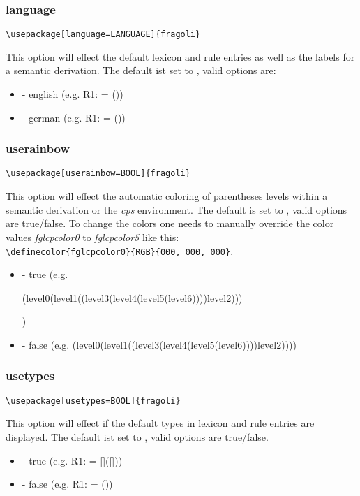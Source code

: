 \documentclass[10pt, a4paper]{article}
\newenvironment{itemizeexample}{
	\begin{itemize}
		\setlength\itemsep{-.5em}
	}
	{
	\end{itemize}
}
\begin{document}
	\subsubsection{language}
	\begin{lstlisting}[style=A]
			\usepackage[language=LANGUAGE]{fragoli}
	\end{lstlisting}
	This option will effect the default lexicon and rule entries as well as the labels for a semantic derivation. The default ist set to \texttt{}, valid options are:
	\begin{itemizeexample}
		\item[-] english (e.g. R1:  = (\lambheN{}))
		\item[-] german (e.g. R1:  = (\lambheN{}))
	\end{itemizeexample}
	\subsubsection{userainbow}
	\begin{lstlisting}[style=A]
			\usepackage[userainbow=BOOL]{fragoli}
	\end{lstlisting}
	This option will effect the automatic coloring of parentheses levels within a semantic derivation or the \textit{cps} environment. The default is set to \texttt{}, valid options are true/false. To change the colors one needs to manually override the color values \textit{fglcpcolor0} to \textit{fglcpcolor5} like this: \\\verb=\definecolor{fglcpcolor0}{RGB}{000, 000, 000}=.
	\begin{itemizeexample}
		\item[-] true (e.g. \begin{cps}(level0(level1((level3(level4(level5(level6))))level2)))\end{cps})
		\item[-] false (e.g. (level0(level1((level3(level4(level5(level6))))level2))))
	\end{itemizeexample}
	\subsubsection{usetypes}
	\begin{lstlisting}[style=A]
			\usepackage[usetypes=BOOL]{fragoli}
	\end{lstlisting}
	This option will effect if the default types in lexicon and rule entries are displayed. The default ist set to \texttt{}, valid options are true/false.
	\begin{itemizeexample}
		\item[-] true (e.g. R1:  = []([]\lambheN[x][\type{e}]))
		\item[-] false (e.g. R1:  = (\lambheN{}))
	\end{itemizeexample}
\end{document}
